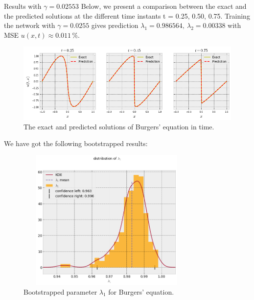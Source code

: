 \documentclass{beamer}
\begin{document}
\begin{frame}{Results with $\gamma=0.02553$}
Below, we present a comparison between the exact and the predicted solutions at the different time instants t = 0.25, 0.50, 0.75. Training the network with $\gamma=0.0255$ gives prediction $\lambda_1 =
0.986564, ~ \lambda_2 = 0.00338$ with MSE $u(x, t) \approx 0.011 \,\%$.

\begin{figure}
    \centering
    \includegraphics[scale=0.43]{images/burgers-exact-predict.png}
    \caption{The exact and predicted solutions of Burgers' equation in time.}
    \label{fig:burgers-exact-predict}
\end{figure}

\end{frame}

\begin{frame}{}

We have got the following bootstrapped results:
\begin{figure}
\centering
\includegraphics[width = 9cm , height = 7cm]{images/bootstraped_l1.png}
\caption{Bootstrapped parameter $\lambda_1$ for Burgers' equation.}
\end{figure}

\end{frame}
\end{document}
